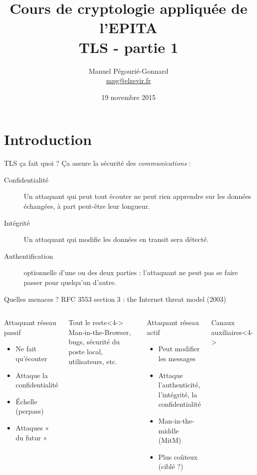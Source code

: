 \documentclass{mpg-ep-slides}
\author[MPG]{Manuel Pégourié-Gonnard\\
  \href{mailto:mpg@elzevir.fr}{{mpg@elzevir.fr}}
}
\institute[ARM]{\normalsize ARM France - IoT - mbed TLS}
\title{Cours de cryptologie appliquée de l'EPITA \\ TLS - partie 1}
\date{19 novembre 2015}
\begin{document}
\lictitle

\section{Introduction}
\tocsect

\begin{frame}{TLS ça fait quoi ?}
  Ça assure la sécurité des \emph{communications} :
  \begin{description}
    \item[Confidentialité] Un attaquant qui peut tout écouter ne peut rien
      apprendre sur les données échangées, à part peut-être leur longueur.
    \item[Intégrité] Un attaquant qui modifie les données en transit sera
      détecté.
    \item[Authentification] optionnelle d'une ou des deux parties :
      l'attaquant ne peut pas se faire passer pour quelqu'un d'autre.
  \end{description}
\end{frame}

\begin{frame}{Quelles menaces ?}
  RFC 3553 section 3 : the Internet threat model (2003)

  \begin{columns}
    \begin{block}{Attaquant réseau passif}
      \begin{itemize}
        \item Ne fait qu'écouter
        \item Attaque la confidentialité
        \item<2-> Échelle (perpass)
        \item<3-> Attaques « du futur »
      \end{itemize}
    \end{block}

    \begin{block}{Tout le reste}<4->
      Man-in-the-Browser, bugs, sécurité du poste local, utilisateurs, etc.
    \end{block}

    \begin{block}{Attaquant réseau actif}
      \begin{itemize}
        \item Peut modifier les messages
        \item Attaque l'authenticité, l'intégrité, la confidentialité
        \item Man-in-the-middle (MitM)
        \item<2-> Plus coûteux (ciblé ?)
      \end{itemize}
    \end{block}

    \begin{block}{Canaux auxiliaires}<4->
    \end{block}
  \end{columns}
\end{frame}
\end{document}
